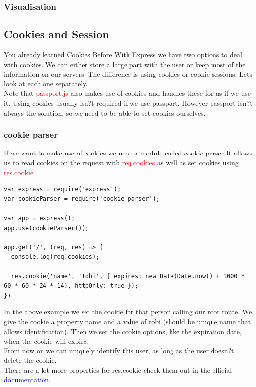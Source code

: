 \documentclass[a4paper]{article}
\begin{document}
\subsubsection{Visualisation}
\subsection{Cookies and Session}
You already learned Cookies Before With Express we have two options to deal with cookies. We can either store a large part with the user or keep most of the information on our servers. The difference is using cookies or cookie sessions. Lets look at each one separately.\\

Note that \textcolor{red}{passport.js} also makes use of cookies and handles these for us if we use it. Using cookies usually isn?t required if we use passport. However passport isn?t always the solution, so we need to be able to set cookies ourselves.

\subsubsection{cookie parser}
If we want to make use of cookies we need a module called cookie-parser It allows us to read cookies on the request with \textcolor{red}{req.cookies} as well as set cookies using \textcolor{red}{res.cookie}

\begin{lstlisting}
var express = require('express');
var cookieParser = require('cookie-parser');

var app = express();
app.use(cookieParser());

app.get('/', (req, res) => {
  console.log(req.cookies);

  res.cookie('name', 'tobi', { expires: new Date(Date.now() + 1000 * 60 * 60 * 24 * 14), httpOnly: true });
})
\end{lstlisting}
In the above example we set the cookie for that person calling our root route. We give the cookie a property name and a value of tobi (should be unique name that allows identification). Then we set the cookie options, like the expiration date, when the cookie will expire.
\\
From now on we can uniquely identify this user, as long as the user doesn?t delete the cookie.
\\
There are a lot more properties for res.cookie check them out in the official \href{https://expressjs.com/en/4x/api.html#res.cookie}{\textcolor{blue}{documentation}}.
\end{document}
